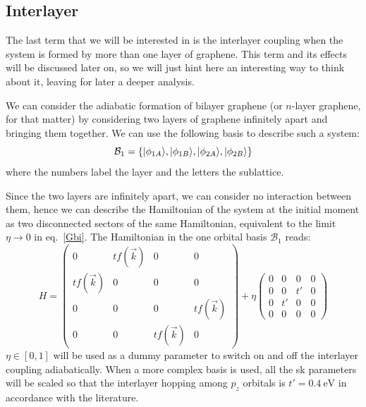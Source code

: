 \subsection{Interlayer}
The last term that we will be interested in is the interlayer coupling when the system is formed by more than one layer of graphene. This term and its effects will be discussed later on, so we will just hint here an interesting way to think about it, leaving for later a deeper analysis.

We can consider the adiabatic formation of bilayer graphene (or $n$-layer graphene, for that matter) by considering two layers of graphene infinitely apart and bringing them together.
We can use the following basis to describe such a system:
\begin{equation}
  \mathcal{B}_1 = \left\{|\phi_{1A}\rangle, |\phi_{1B}\rangle,
                        |\phi_{2A}\rangle, |\phi_{2B}\rangle\right\}
\label{basis_bi}
\end{equation}
where the numbers label the layer and the letters the sublattice.

Since the two layers are infinitely apart, we can consider no interaction between them, hence we can describe the Hamiltonian of the system at the initial moment as two disconnected sectors of the same Hamiltonian, equivalent to the limit $\eta\rightarrow0$ in eq.~\eqref{Gbi}. The Hamiltonian in the one orbital basis $\mathcal{B}_1$ reads:
\begin{equation}
  H = \left(\begin{array}{cc|cc}
     0 & tf(\vec{k}) & 0 & 0 \\
     tf(\vec{k}) & 0 & 0 & 0 \\ \hline
     0 & 0 & 0 & tf(\vec{k}) \\
     0 & 0 & tf(\vec{k}) & 0
  \end{array}\right) + 
  \eta \left(\begin{array}{cc|cc}
     0 & 0  & 0  & 0 \\
     0 & 0  & t' & 0 \\ \hline
     0 & t' & 0  & 0 \\
     0 & 0  & 0  & 0
  \end{array}\right)
\label{Gbi}
\end{equation}
$\eta\in[0,1]$ will be used as a dummy parameter to switch on and off the interlayer coupling adiabatically.
When a more complex basis is used, all the \ac{sk} parameters will be scaled so that the interlayer hopping among $p_z$ orbitals is $t'=\SI{0.4}{\eV}$ in accordance with the literature\cite{KatsnelsonBook}.






